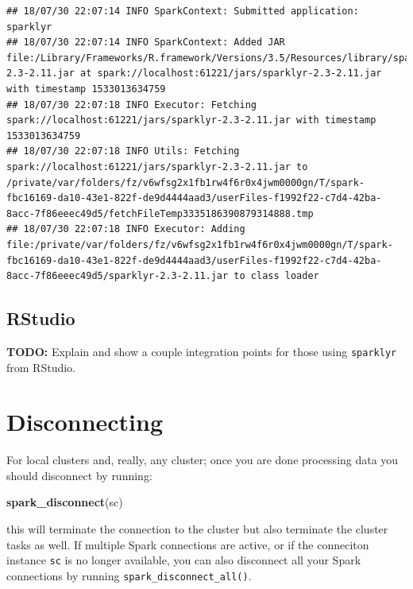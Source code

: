 \documentclass[]{book}
\newenvironment{Shaded}{\begin{snugshade}}{\end{snugshade}}
\newcommand{\KeywordTok}[1]{\textcolor[rgb]{0.13,0.29,0.53}{\textbf{#1}}}
\newcommand{\NormalTok}[1]{#1}
\theoremstyle{definition}
\theoremstyle{definition}
\theoremstyle{definition}
\theoremstyle{remark}
\begin{document}
\begin{verbatim}
## 18/07/30 22:07:14 INFO SparkContext: Submitted application: sparklyr
## 18/07/30 22:07:14 INFO SparkContext: Added JAR file:/Library/Frameworks/R.framework/Versions/3.5/Resources/library/sparklyr/java/sparklyr-2.3-2.11.jar at spark://localhost:61221/jars/sparklyr-2.3-2.11.jar with timestamp 1533013634759
## 18/07/30 22:07:18 INFO Executor: Fetching spark://localhost:61221/jars/sparklyr-2.3-2.11.jar with timestamp 1533013634759
## 18/07/30 22:07:18 INFO Utils: Fetching spark://localhost:61221/jars/sparklyr-2.3-2.11.jar to /private/var/folders/fz/v6wfsg2x1fb1rw4f6r0x4jwm0000gn/T/spark-fbc16169-da10-43e1-822f-de9d4444aad3/userFiles-f1992f22-c7d4-42ba-8acc-7f86eeec49d5/fetchFileTemp3335186390879314888.tmp
## 18/07/30 22:07:18 INFO Executor: Adding file:/private/var/folders/fz/v6wfsg2x1fb1rw4f6r0x4jwm0000gn/T/spark-fbc16169-da10-43e1-822f-de9d4444aad3/userFiles-f1992f22-c7d4-42ba-8acc-7f86eeec49d5/sparklyr-2.3-2.11.jar to class loader
\end{verbatim}

\hypertarget{using-spark-from-rstudio}{%
\subsection{RStudio}\label{using-spark-from-rstudio}}

\textbf{TODO:} Explain and show a couple integration points for those
using \texttt{sparklyr} from RStudio.

\hypertarget{disconnecting}{%
\section{Disconnecting}\label{disconnecting}}

For local clusters and, really, any cluster; once you are done
processing data you should disconnect by running:

\begin{Shaded}
\begin{Highlighting}[]
\KeywordTok{spark_disconnect}\NormalTok{(sc)}
\end{Highlighting}
\end{Shaded}

this will terminate the connection to the cluster but also terminate the
cluster tasks as well. If multiple Spark connections are active, or if
the conneciton instance \texttt{sc} is no longer available, you can also
disconnect all your Spark connections by running
\texttt{spark\_disconnect\_all()}.
\end{document}
